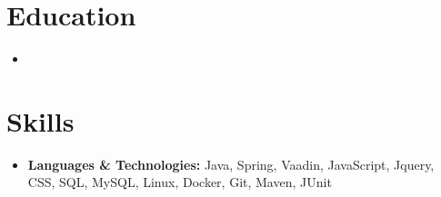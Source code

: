 \documentclass[11pt,a4paper,sans]{moderncv}        %
\begin{document}
    \section{Education}

    \vspace{5pt}

    \begin{itemize}

        \item{}

    \end{itemize}

    \vspace{2pt}

    \section{ Skills}

    \vspace{6pt}

    \begin{itemize}

        \item \textbf{Languages \& Technologies:} Java, Spring, Vaadin, JavaScript, Jquery, CSS, SQL, MySQL, Linux, Docker, Git, Maven, JUnit






    \end{itemize}


\end{document}
